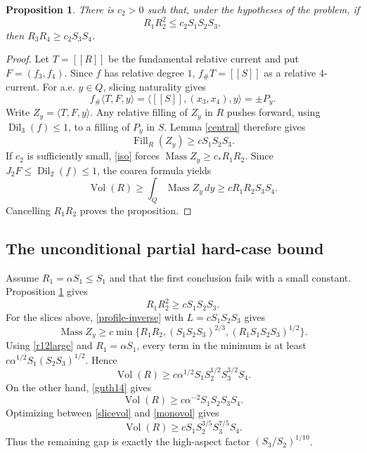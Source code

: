 \documentclass[12pt]{article}
\newtheorem{proposition}{Proposition}
\newcommand{\Dil}{\operatorname{Dil}}
\newcommand{\Vol}{\operatorname{Vol}}
\newcommand{\Mass}{\operatorname{Mass}}
\newcommand{\Fill}{\operatorname{Fill}}
\begin{document}
\begin{proposition}\label{firstalt}
There is \(c_2>0\) such that, under the hypotheses of the problem, if
\[
        R_1R_2^2\le c_2S_1S_2S_3 ,
\]
then \(R_3R_4\ge c_2S_3S_4\).
\end{proposition}

\begin{proof}
Let \(T=[[R]]\) be the fundamental relative current and put \(F=(f_3,f_4)\).
Since \(f\) has relative degree \(1\), \(f_\#T=[[S]]\) as a relative
\(4\)-current.  For a.e. \(y\in Q\), slicing naturality gives
\[
        f_\#\langle T,F,y\rangle
        =\langle [[S]],(x_3,x_4),y\rangle=\pm P_y .
\]
Write \(Z_y=\langle T,F,y\rangle\).  Any relative filling of \(Z_y\) in \(R\)
pushes forward, using \(\Dil_3(f)\le1\), to a filling of \(P_y\) in \(S\).
Lemma \ref{central} therefore gives
\[
        \Fill_R(Z_y)\ge cS_1S_2S_3 .
\]
If \(c_2\) is sufficiently small, \eqref{iso} forces
\(\Mass Z_y\ge c_*R_1R_2\).  Since \(J_2F\le\Dil_2(f)\le1\), the coarea
formula yields
\[
 \Vol(R)\ge\int_Q\Mass Z_y\,dy
        \ge cR_1R_2S_3S_4 .
\]
Cancelling \(R_1R_2\) proves the proposition.
\end{proof}

\subsection*{The unconditional partial hard-case bound}

Assume \(R_1=\alpha S_1\le S_1\) and that the first conclusion fails with a
small constant.  Proposition \ref{firstalt} gives
\begin{equation}\label{r12large}
        R_1R_2^2\ge cS_1S_2S_3 .
\end{equation}
For the slices above, \eqref{profile-inverse} with
\(L=cS_1S_2S_3\) gives
\[
\Mass Z_y\ge c\min\{R_1R_2,(S_1S_2S_3)^{2/3},
                         (R_1S_1S_2S_3)^{1/2}\}.
\]
Using \eqref{r12large} and \(R_1=\alpha S_1\), every term in the minimum is
at least \(c\alpha^{1/2}S_1(S_2S_3)^{1/2}\).  Hence
\begin{equation}\label{slicevol}
        \Vol(R)\ge
        c\alpha^{1/2}S_1S_2^{1/2}S_3^{3/2}S_4 .
\end{equation}
On the other hand, \eqref{guth14} gives
\begin{equation}\label{monovol}
        \Vol(R)\ge
        c\alpha^{-2}S_1S_2S_3S_4 .
\end{equation}
Optimizing between \eqref{slicevol} and \eqref{monovol} gives
\[
        \Vol(R)\ge cS_1S_2^{3/5}S_3^{7/5}S_4 .
\]
Thus the remaining gap is exactly the high-aspect factor
\((S_3/S_2)^{1/10}\).
\end{document}
